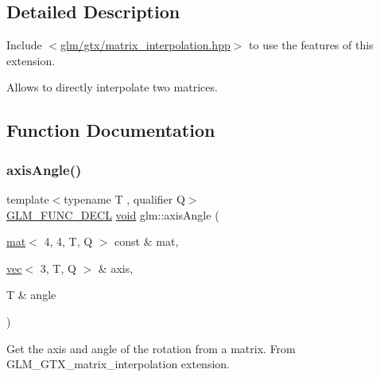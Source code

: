 \subsection{Detailed Description}
Include $<$\mbox{\hyperlink{matrix__interpolation_8hpp}{glm/gtx/matrix\+\_\+interpolation.\+hpp}}$>$ to use the features of this extension.

Allows to directly interpolate two matrices. 

\subsection{Function Documentation}
\mbox{\label{group__gtx__matrix__interpolation_ga97f160158906ea89676f56cc4697ec98}} 
\subsubsection{\texorpdfstring{axis\+Angle()}{axisAngle()}}
{\footnotesize\ttfamily template$<$typename T , qualifier Q$>$ \\
\mbox{\hyperlink{setup_8hpp_ab2d052de21a70539923e9bcbf6e83a51}{G\+L\+M\+\_\+\+F\+U\+N\+C\+\_\+\+D\+E\+CL}} \mbox{\hyperlink{_s_d_l__opengles2__gl2ext_8h_ae5d8fa23ad07c48bb609509eae494c95}{void}} glm\+::axis\+Angle (\begin{DoxyParamCaption}\item[{\mbox{\hyperlink{structglm_1_1mat}{mat}}$<$ 4, 4, T, Q $>$ const \&}]{mat,  }\item[{\mbox{\hyperlink{structglm_1_1vec}{vec}}$<$ 3, T, Q $>$ \&}]{axis,  }\item[{T \&}]{angle }\end{DoxyParamCaption})}

Get the axis and angle of the rotation from a matrix. From G\+L\+M\+\_\+\+G\+T\+X\+\_\+matrix\+\_\+interpolation extension. \mbox{\label{group__gtx__matrix__interpolation_ga992a5db71893ed1ba6ebac99f0f69831}} 
